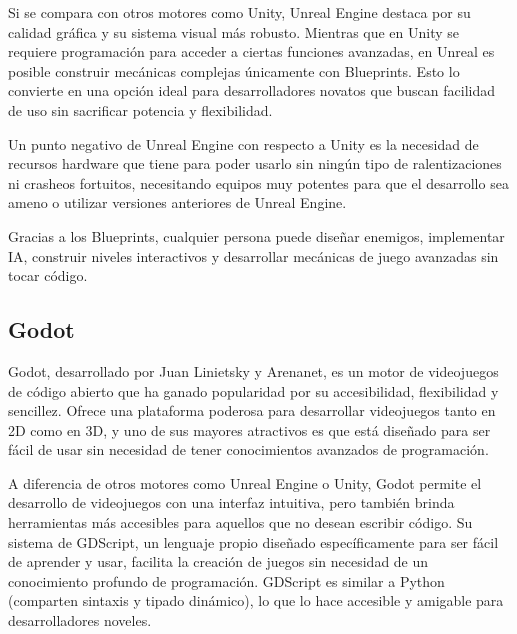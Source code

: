 Si se compara con otros motores como Unity, Unreal Engine destaca por su calidad gráfica y su sistema visual más robusto. Mientras que en Unity se requiere programación para acceder a ciertas funciones avanzadas, en Unreal es posible construir mecánicas complejas únicamente con Blueprints. Esto lo convierte en una opción ideal para desarrolladores novatos que buscan facilidad de uso sin sacrificar potencia y flexibilidad.

Un punto negativo de Unreal Engine con respecto a Unity es la necesidad de recursos hardware que tiene para poder usarlo sin ningún tipo de ralentizaciones ni crasheos fortuitos, necesitando equipos muy potentes para que el desarrollo sea ameno o utilizar versiones anteriores de Unreal Engine.

Gracias a los Blueprints, cualquier persona puede diseñar enemigos, implementar IA, construir niveles interactivos y desarrollar mecánicas de juego avanzadas sin tocar código. 
\subsection{Godot}

Godot, desarrollado por Juan Linietsky y Arenanet, es un motor de videojuegos de código abierto que ha ganado popularidad por su accesibilidad, flexibilidad y sencillez. Ofrece una plataforma poderosa para desarrollar videojuegos tanto en 2D como en 3D, y uno de sus mayores atractivos es que está diseñado para ser fácil de usar sin necesidad de tener conocimientos avanzados de programación.

A diferencia de otros motores como Unreal Engine o Unity, Godot permite el desarrollo de videojuegos con una interfaz intuitiva, pero también brinda herramientas más accesibles para aquellos que no desean escribir código. Su sistema de GDScript, un lenguaje propio diseñado específicamente para ser fácil de aprender y usar, facilita la creación de juegos sin necesidad de un conocimiento profundo de programación. GDScript es similar a Python (comparten sintaxis y tipado dinámico), lo que lo hace accesible y amigable para desarrolladores noveles.

